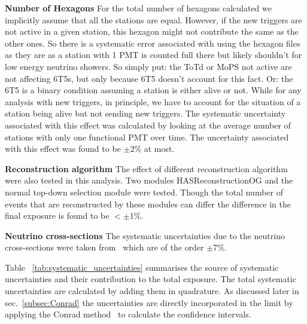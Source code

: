 \begin{description}
  \item \textbf{Number of Hexagons} For the total number of hexagons calculated we implicitly assume that all the stations are equal. However, if the new triggers are not active in a given station, this hexagon might not contribute the same as the other ones. So there is a systematic error associated with using the hexagon files as they are as a station with 1 PMT is counted full there but likely shouldn't for low energy neutrino showers. So simply put: the ToTd or MoPS not active are not affecting 6T5s, but only because 6T5 doesn't account for this fact. Or: the 6T5 is a binary condition assuming a station is either alive or not. While for any analysis with new triggers, in principle, we have to account for the situation of a station being alive but not sending new triggers. The systematic uncertainty associated with this effect was calculated by looking at the average number of stations with only one functional PMT over time. The uncertainty associated with this effect was found to be $\pm 2\%$ at most. 
  \item \textbf{Reconstruction algorithm} The effect of different reconstruction algorithm were also tested in this analysis. Two modules HASReconstructionOG and the normal top-down selection module were tested. Though the total number of events that are reconstructed by these modules can differ the difference in the final exposure is found to be $< \pm 1\%$. 
  \item \textbf{Neutrino cross-sections} The systematic uncertainties due to the neutrino cross-sections were taken from~\cite{Cooper-Sarkar:2011jtt} which are of the order $\pm 7\%$.
\end{description}

Table ~\ref{tab:systematic_uncertainties} summarises the  source of systematic uncertainties and their contribution to the total exposure. The total systematic uncertainties are calculated by adding them in quadrature. As discussed later in sec.~\ref{subsec:Conrad} the uncertainties are directly incorporated in the limit by applying the Conrad method~\cite{Conrad:2002kn} to calculate the confidence intervals. 

